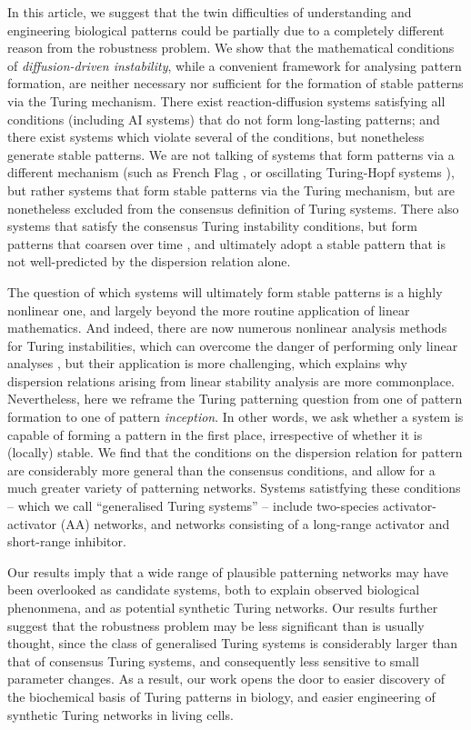 In this article, we suggest that the twin difficulties of understanding and engineering biological patterns could be partially due to a completely different reason from the robustness problem. 
We show that the mathematical conditions of \emph{diffusion-driven instability}, while a convenient framework for analysing pattern formation, are neither necessary nor sufficient for the formation of stable patterns via the Turing mechanism. There exist reaction-diffusion systems satisfying all conditions (including AI systems) that do not form long-lasting patterns; and there exist systems which violate several of the conditions, but nonetheless generate stable patterns. We are not talking of systems that form patterns via a different mechanism (such as French Flag \cite{wolpert1969positional}, or oscillating Turing-Hopf systems \cite{baurmann2007instabilities}), but rather systems that form stable patterns via the Turing mechanism, but are nonetheless excluded from the consensus definition of Turing systems. There also systems that satisfy the consensus Turing instability conditions, but form patterns that coarsen over time \cite{kolokolnikov2006}, and ultimately adopt a stable pattern that is not well-predicted by the dispersion relation alone.

The question of which systems will ultimately form stable patterns is a highly nonlinear one, and largely beyond the more routine application of linear mathematics. 
And indeed, there are now numerous nonlinear analysis methods for Turing instabilities, which can overcome the danger of performing only linear analyses \cite{}, but their application is more challenging, which explains why dispersion relations arising from linear stability analysis are more commonplace. 
Nevertheless, here we reframe the Turing patterning question from one of pattern formation to one of pattern \emph{inception}. 
In other words, we ask whether a system is capable of forming a pattern in the first place, irrespective of whether it is (locally) stable. 
We find that the conditions on the dispersion relation for pattern are considerably more general than the consensus conditions, and allow for a much greater variety of patterning networks. 
Systems satistfying these conditions -- which we call ``generalised Turing systems'' -- include two-species activator-activator (AA) networks, and networks consisting of a long-range activator and short-range inhibitor. 

Our results imply that a wide range of plausible patterning networks may have been overlooked as candidate systems, both to explain observed biological phenonmena, and as potential synthetic Turing networks. Our results further suggest that the robustness problem may be less significant than is usually thought, since the class of generalised Turing systems is considerably larger than that of consensus Turing systems, and consequently less sensitive to small parameter changes. As a result, our work opens the door to easier discovery of the biochemical basis of Turing patterns in biology, and easier engineering of synthetic Turing networks in living cells.
